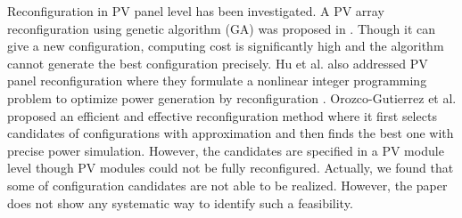 \documentclass[conference]{pvsctran}
\begin{document}
Reconfiguration in PV panel level has been investigated\cite{carotenuto2015evolutionary,hu2017non,orozco2016optimized}. 
A PV array reconfiguration using genetic algorithm (GA) was proposed in \cite{carotenuto2015evolutionary}. Though it can give a new configuration, computing cost is significantly high and the algorithm cannot generate the best configuration precisely.  
Hu et al. also addressed PV panel reconfiguration where they formulate a nonlinear integer programming problem to optimize power generation by reconfiguration \cite{hu2017non}.
Orozco-Gutierrez et al. proposed an efficient and effective reconfiguration method\cite{orozco2016optimized} where it first selects candidates of configurations with approximation and then finds the best one with precise power simulation. 
However, the candidates are specified in a PV module level though PV modules could not be fully reconfigured. Actually, we found that some of configuration candidates are not able to be realized. However, the paper\cite{orozco2016optimized}  does not show any systematic way to identify such a feasibility. 
\end{document}
